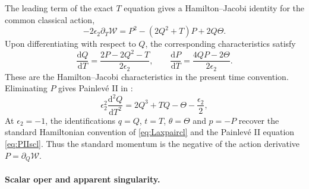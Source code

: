 \documentclass[a4paper,11pt]{article}
\newcommand{\dd}{\mathrm{d}}
\numberwithin{equation}{section}
\begin{document}
The leading term of the exact $T$ equation gives a Hamilton--Jacobi
identity for the common classical action,
\begin{equation}
	\label{equation:PII classical WZW Hamilton Jacobi}
	-2\epsilon_{2}\partial_{T}\mathcal{W}
	=P^{2}-(2Q^{2}+T)P+2Q\Theta.
\end{equation}
Upon differentiating with respect to $Q$, the corresponding
characteristics satisfy
\begin{equation}
	\label{equation:PII classical WZW characteristics}
	\frac{\dd Q}{\dd T}
	=\frac{2P-2Q^{2}-T}{2\epsilon_{2}},
	\qquad
	\frac{\dd P}{\dd T}
	=\frac{4QP-2\Theta}{2\epsilon_{2}}.
\end{equation}
These are the Hamilton--Jacobi characteristics in the present
time convention.
Eliminating $P$ gives Painlev\'e II in :
\begin{equation}
	\label{equation:PII classical WZW Painleve equation}
	\epsilon_{2}^{2}\frac{\dd^{2}Q}{\dd T^{2}}
	=2Q^{3}+TQ-\Theta-\frac{\epsilon_{2}}{2},
\end{equation}
At $\epsilon_{2}=-1$, the identifications $q=Q$, $t=T$,
$\theta=\Theta$ and $p=-P$ recover the standard Hamiltonian
convention of \eqref{eq:Laxpaircl} and the Painlev\'e II equation
\eqref{eq:PIIscl}.  Thus the standard momentum is the negative of
the action derivative $P=\partial_{Q}\mathcal{W}$.

\paragraph{Scalar oper and apparent singularity.}
\label{subsection:PII WZW scalar oper}
\end{document}
